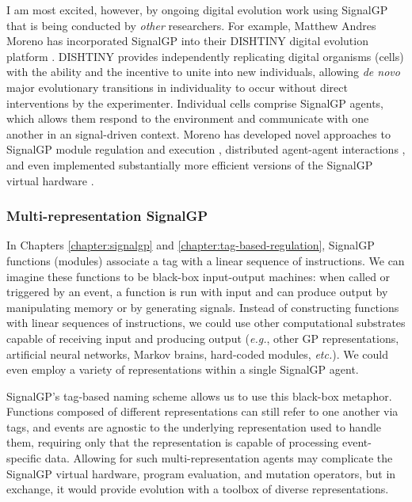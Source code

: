 
I am most excited, however, by ongoing digital evolution work using SignalGP that is being conducted by \textit{other} researchers. 
For example, Matthew Andres Moreno has incorporated SignalGP into their DISHTINY digital evolution platform \citep{moreno_toward_2019,Lalejini_Moreno_Ofria_DISHTINY_2020}.
DISHTINY provides independently replicating digital organisms (cells) with the ability and the incentive to unite into new individuals, allowing \textit{de novo} major evolutionary transitions in individuality to occur without direct interventions by the experimenter. 
Individual cells comprise SignalGP agents, which allows them respond to the environment and communicate with one another in an signal-driven context.
Moreno has developed novel approaches to SignalGP module regulation and execution \citep{Moreno_2021}, distributed agent-agent interactions \citep{Moreno_Ofria_2020}, and even implemented substantially more efficient versions of the SignalGP virtual hardware \citep{Moreno_Rodriguez-Papa_2021}. 

\subsubsection{Multi-representation SignalGP}

In Chapters \ref{chapter:signalgp} and \ref{chapter:tag-based-regulation}, SignalGP functions (modules) associate a tag with a linear sequence of instructions. 
We can imagine these functions to be black-box input-output machines: when called or triggered by an event, a function is run with input and can produce output by manipulating memory or by generating signals. 
Instead of constructing functions with linear sequences of instructions, we could use other computational substrates capable of receiving input and producing output (\textit{e.g.}, other GP representations, artificial neural networks, Markov brains, hard-coded modules, \textit{etc.}). 
We could even employ a variety of representations within a single SignalGP agent. 

SignalGP's tag-based naming scheme allows us to use this black-box metaphor. 
Functions composed of different representations can still refer to one another via tags, and events are agnostic to the underlying representation used to handle them, requiring only that the representation is capable of processing event-specific data. 
Allowing for such multi-representation agents may complicate the SignalGP virtual hardware, program evaluation, and mutation operators, but in exchange, it would provide evolution with a toolbox of diverse representations. 

